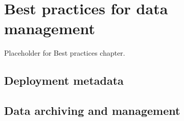 \setchapterpreamble[u]{\margintoc}
\chapter{\color{gray} Best practices for data management \color{black}}

Placeholder for Best practices chapter.

\section{\color{gray} Deployment metadata \color{black}}

\section{\color{gray}Data archiving and management \color{black}}
